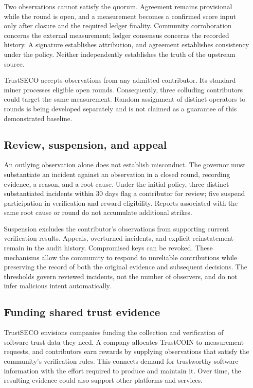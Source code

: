 \documentclass[10pt,conference]{IEEEtran}
\begin{document}
Two observations cannot satisfy the quorum. Agreement remains provisional while the round is open, and a measurement becomes a confirmed score input only after closure and the required ledger finality. Community corroboration concerns the external measurement; ledger consensus concerns the recorded history. A signature establishes attribution, and agreement establishes consistency under the policy. Neither independently establishes the truth of the upstream source.

TrustSECO accepts observations from any admitted contributor. Its standard miner processes eligible open rounds. Consequently, three colluding contributors could target the same measurement. Random assignment of distinct operators to rounds is being developed separately and is not claimed as a guarantee of this demonstrated baseline.

\subsection{Review, suspension, and appeal}
An outlying observation alone does not establish misconduct. The governor must substantiate an incident against an observation in a closed round, recording evidence, a reason, and a root cause. Under the initial policy, three distinct substantiated incidents within 30 days flag a contributor for review; five suspend participation in verification and reward eligibility. Reports associated with the same root cause or round do not accumulate additional strikes.

Suspension excludes the contributor's observations from supporting current verification results. Appeals, overturned incidents, and explicit reinstatement remain in the audit history. Compromised keys can be revoked. These mechanisms allow the community to respond to unreliable contributions while preserving the record of both the original evidence and subsequent decisions. The thresholds govern reviewed incidents, not the number of observers, and do not infer malicious intent automatically.

\subsection{Funding shared trust evidence}
TrustSECO envisions companies funding the collection and verification of software trust data they need. A company allocates TrustCOIN to measurement requests, and contributors earn rewards by supplying observations that satisfy the community's verification rules. This connects demand for trustworthy software information with the effort required to produce and maintain it. Over time, the resulting evidence could also support other platforms and services.
\end{document}
